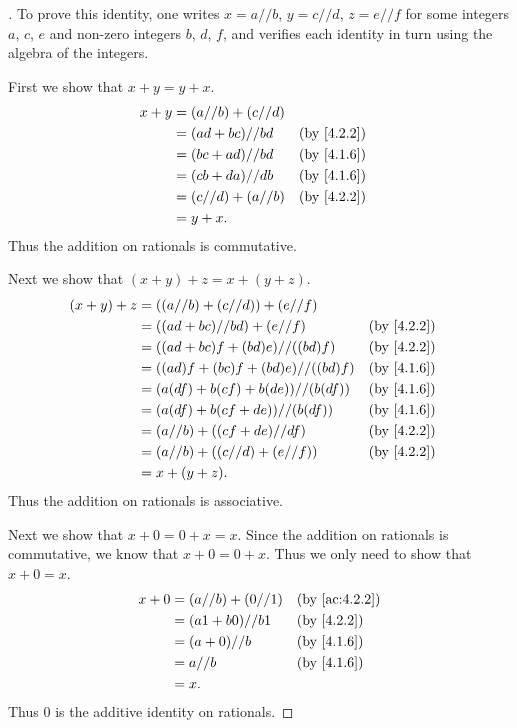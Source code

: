 \begin{proof}[]
  To prove this identity, one writes \(x = a // b\), \(y = c // d\), \(z = e // f\) for some integers \(a\), \(c\), \(e\) and non-zero integers \(b\), \(d\), \(f\), and verifies each identity in turn using the algebra of the integers.

  First we show that \(x + y = y + x\).
  \begin{align*}
    x + y & = (a // b) + (c // d)                 \\
          & = (ad + bc) // bd     &  & \by{4.2.2} \\
          & = (bc + ad) // bd     &  & \by{4.1.6} \\
          & = (cb + da) // db     &  & \by{4.1.6} \\
          & = (c // d) + (a // b) &  & \by{4.2.2} \\
          & = y + x.
  \end{align*}
  Thus the addition on rationals is commutative.

  Next we show that \((x + y) + z = x + (y + z)\).
  \begin{align*}
    (x + y) + z & = ((a // b) + (c // d)) + (e // f)                   \\
                & = ((ad + bc) // bd) + (e // f)       &  & \by{4.2.2} \\
                & = ((ad + bc)f + (bd)e) // ((bd)f)    &  & \by{4.2.2} \\
                & = ((ad)f + (bc)f + (bd)e) // ((bd)f) &  & \by{4.1.6} \\
                & = (a(df) + b(cf) + b(de)) // (b(df)) &  & \by{4.1.6} \\
                & = (a(df) + b(cf + de)) // (b(df))    &  & \by{4.1.6} \\
                & = (a // b) + ((cf + de) // df)       &  & \by{4.2.2} \\
                & = (a // b) + ((c // d) + (e // f))   &  & \by{4.2.2} \\
                & = x + (y + z).
  \end{align*}
  Thus the addition on rationals is associative.

  Next we show that \(x + 0 = 0 + x = x\).
  Since the addition on rationals is commutative, we know that \(x + 0 = 0 + x\).
  Thus we only need to show that \(x + 0 = x\).
  \begin{align*}
    x + 0 & = (a // b) + (0 // 1) &  & \by{ac:4.2.2} \\
          & = (a1 + b0) // b1     &  & \by{4.2.2}    \\
          & = (a + 0) // b        &  & \by{4.1.6}    \\
          & = a // b              &  & \by{4.1.6}    \\
          & = x.
  \end{align*}
  Thus \(0\) is the additive identity on rationals.


\end{proof}
